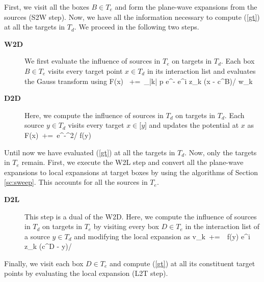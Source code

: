 First, we visit all the boxes $B \in T_e$ and form the plane-wave expansions from the sources (S2W step). Now, we have all the information necessary to compute (\ref{gt}) at all the targets in $T_d$. We proceed in the following two steps.
\begin{description}
\item[\textbf{W2D}] We first evaluate the influence of sources in $T_e$ on targets in $T_d$. Each box $B \in T_e$ visits every target point $x \in T_d$ in its interaction list and evaluates the Gauss transform using
%
\beq F(x) \, +=\, \sum_{|k| \leq p} e^{-} e^{i z_k \cdot (x - c^B)/\sqrt{\delta}} w_k \eeq
%
\item[\textbf{D2D}] Here, we compute the influence of sources in $T_d$ on targets in $T_d$. Each source $y \in T_d$ visits every target $x \in \mathcal[y]$ and updates the potential at $x$ as 
%  
\beq F(x) \,+=\, e^{-^2/\sqrt{\delta}} f(y) \eeq
%
\end{description}
%
Until now we have evaluated (\ref{gt}) at all the targets in $T_d$. Now, only the targets in $T_e$ remain. First, we execute the W2L step and convert all the plane-wave expansions to local expansions at target boxes by using the algorithms of Section \ref{sc:sweep}. This accounts for all the sources in $T_e$. 

\begin{description}
\item[\textbf{D2L}] This step is a dual of the W2D. Here, we compute the influence of sources in $T_d$ on targets in $T_e$ by visiting every box $D \in T_e$ in the interaction list of a source $y \in T_d$ and modifying the local expansion as 
%
\beq v_k  \,+=\, \, f(y) e^{i z_k \cdot (c^D - y)/\sqrt{\delta}} \eeq
\end{description}
Finally, we visit each box $D \in T_e$ and compute (\ref{gt}) at all its constituent target points by evaluating the local expansion (L2T step). 
